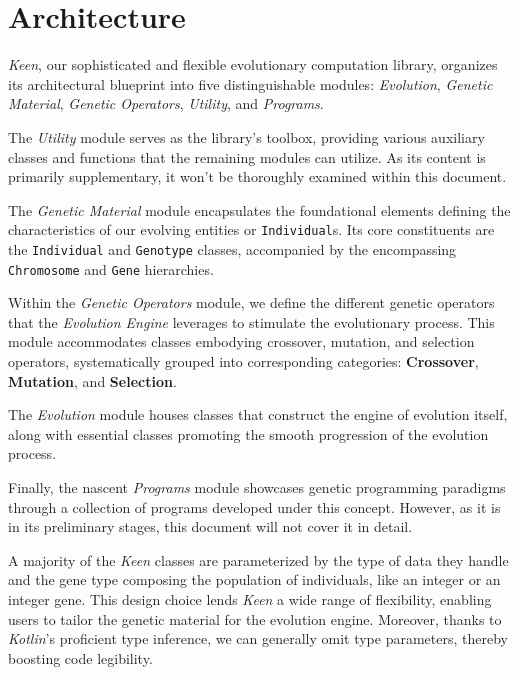 \section{Architecture}
\label{sec:architecture}
  \textit{Keen}, our sophisticated and flexible evolutionary computation
  library, organizes its architectural blueprint into five distinguishable
  modules: \textit{Evolution}, \textit{Genetic Material},
  \textit{Genetic Operators}, \textit{Utility}, and \textit{Programs}.

  The \emph{Utility} module serves as the library's toolbox, providing various 
  auxiliary classes and functions that the remaining modules can utilize.
  As its content is primarily supplementary, it won't be thoroughly examined 
  within this document.

  The \emph{Genetic Material} module encapsulates the foundational elements 
  defining the characteristics of our evolving entities or \texttt{Individual}s.
  Its core constituents are the \texttt{Individual} and \texttt{Genotype} 
  classes, accompanied by the encompassing \texttt{Chromosome} and \texttt{Gene} 
  hierarchies.

  Within the \emph{Genetic Operators} module, we define the different genetic 
  operators that the \textit{Evolution Engine} leverages to stimulate the 
  evolutionary process.
  This module accommodates classes embodying crossover, mutation, and selection 
  operators, systematically grouped into corresponding categories: 
  \textbf{Crossover}, \textbf{Mutation}, and \textbf{Selection}.

  The \emph{Evolution} module houses classes that construct the engine of 
  evolution itself, along with essential classes promoting the smooth 
  progression of the evolution process.

  Finally, the nascent \emph{Programs} module showcases genetic programming 
  paradigms through a collection of programs developed under this concept.
  However, as it is in its preliminary stages, this document will not cover it 
  in detail.

  A majority of the \textit{Keen} classes are parameterized by the type of data 
  they handle and the gene type composing the population of individuals, like an 
  integer or an integer gene.
  This design choice lends \textit{Keen} a wide range of flexibility, enabling 
  users to tailor the genetic material for the evolution engine.
  Moreover, thanks to \textit{Kotlin}'s proficient type inference, we can 
  generally omit type parameters, thereby boosting code legibility.

